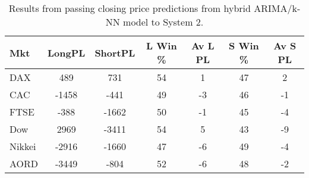 \begin{table}[ht]
\centering
\caption[Results from passing closing price predictions from hybrid ARIMA/k-NN model to System 2]{Results from passing closing price predictions from hybrid ARIMA/k-NN model to System 2.} 
\label{tab:chp_ts:pred_close_arima_knn_sys2}
\begin{tabular}{lcccccc}
  \toprule Mkt & LongPL & ShortPL & L Win \% & Av L PL & S Win \% & Av S PL \\ 
  \midrule DAX & 489 & 731 & 54 & 1 & 47 & 2 \\ 
  CAC & -1458 & -441 & 49 & -3 & 46 & -1 \\ 
  FTSE & -388 & -1662 & 50 & -1 & 45 & -4 \\ 
  Dow & 2969 & -3411 & 54 & 5 & 43 & -9 \\ 
  Nikkei & -2916 & -1660 & 47 & -6 & 49 & -4 \\ 
  AORD & -3449 & -804 & 52 & -6 & 48 & -2 \\ 
   \bottomrule \end{tabular}
\end{table}
